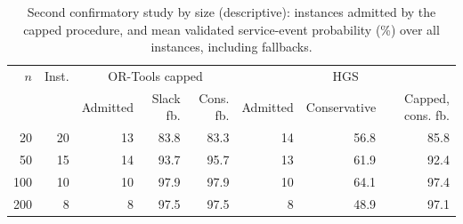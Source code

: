 \begin{table}[htbp]
\centering
\footnotesize
\caption{Second confirmatory study by size (descriptive): instances admitted by the capped procedure, and mean validated service-event probability (\%) over all instances, including fallbacks.}
\label{tab:study2-size}
\begin{tabular}{@{}rrrrrrrr@{}}
\toprule
$n$ & Inst. & \multicolumn{3}{c}{OR-Tools capped} & \multicolumn{3}{c}{HGS} \\ & & Admitted & Slack fb. & Cons. fb. & Admitted & Conservative & Capped, cons. fb.\\
\midrule
20 & 20 & 13 & 83.8 & 83.3 & 14 & 56.8 & 85.8\\
50 & 15 & 14 & 93.7 & 95.7 & 13 & 61.9 & 92.4\\
100 & 10 & 10 & 97.9 & 97.9 & 10 & 64.1 & 97.4\\
200 & 8 & 8 & 97.5 & 97.5 & 8 & 48.9 & 97.1\\
\bottomrule
\end{tabular}
\end{table}
